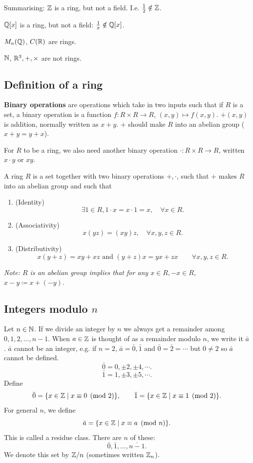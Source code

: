 \documentclass[10pt, a4paper]{article}
\begin{document}
Summarising:
$\mathbb{Z}$ is a ring,
but not a field.
I.e. $\frac{1}{2} \notin \mathbb{Z}$.

$\mathbb{Q}[x]$ is a ring,
but not a field:
$\frac{1}{x} \notin \mathbb{Q}[x]$.

$M_n(\mathbb{Q})$,
$C(\mathbb{R})$ are rings.

$\mathbb{N}$,
$\mathbb{R} ^ 3, +, \times$ are not rings.

\subsection{Definition of a ring}

\textbf{Binary operations} are operations which take in two inputs such that if $R$ is a set,
a binary operation is a function $f : R \times R \to R$,
$(x, y) \mapsto f(x, y)$.
$+(x, y)$ is addition,
normally written as $x + y$.
$+$ should make $R$ into an abelian group
($x + y = y + x$).

For $R$ to be a ring,
we also need another binary operation $\cdot : R \times R \to R$,
written $x \cdot y$ or $xy$.

\begin{definition}[Ring]
    A ring $R$ is a set together with two binary operations $+, \cdot$,
    such that $+$ makes $R$ into an abelian group and such that
    
    \begin{enumerate}[label = (\roman*)]
        \item (Identity)
        \[
        \exists 1 \in R, 1 \cdot x = x \cdot 1 = x,\quad\forall x \in R.
        \]

        \item (Associativity)
        \[
        x(yz) = (xy)z,\quad\forall x, y, z \in R.
        \]

        \item (Distributivity)
        \[
        x(y + z) = xy + xz\text{ and } (y + z)x = yx + zx\qquad\forall x, y, z \in R.
        \]
    \end{enumerate}
\end{definition}

\textit{Note:
$R$ is an abelian group implies that for any $x \in R, -x \in R$,
$x - y \coloneqq x + (-y)$.}

\subsection{Integers modulo \texorpdfstring{$n$}{}}
Let $n \in \mathbb{N}$.
If we divide an integer by $n$ we always get a remainder among $0, 1, 2, \dotsc, n - 1$.
When $a \in \mathbb{Z}$ is thought of as a remainder modulo $n$,
we write it $\bar{a}$.
$\bar{a}$ cannot be an integer,
e.g. if $n = 2$,
$\bar{a} = \bar{0}, \bar{1}$ and $\bar{0} = \bar{2} = \dotsi$ but $0 \neq 2$ so $\bar{a}$ cannot be defined.
\[
\bar{0} = 0, \pm 2, \pm 4, \dotsi.
\]
\[
\bar{1} = 1, \pm 3, \pm 5, \dotsi.
\]
Define
\[
\bar{0} = \{x \in \mathbb{Z}\mid x \equiv 0 \pmod{2}\},\qquad\bar{1} = \{x \in \mathbb{Z} \mid x \equiv 1\pmod{2}\}.
\]
For general $n$,
we define
\[
\bar{a} = \{x \in \mathbb{Z} \mid x \equiv a \pmod{n}\}.
\]
This is called a residue class.
There are $n$ of these:
\[
\bar{0}, \bar{1}, \dotsc, \overline{n - 1}.
\]
We denote this set by $\mathbb{Z} / n$
(sometimes written $\mathbb{Z}_{n}$).
\end{document}

